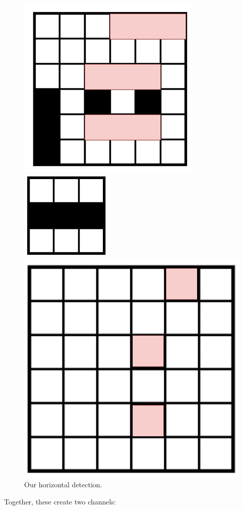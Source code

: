         \begin{figure}[ht]
            \begin{minipage}{.35\textwidth}
              \centering
              \includegraphics[width=.35\linewidth]{images/convolutional_neural_networks_images/horizontal_detection.png}
            \end{minipage}
            \begin{minipage}{.25\textwidth}
                \centering
                \includegraphics[width=.25\linewidth]{images/convolutional_neural_networks_images/horizontal_filter.png}
                \caption*{$\mathlarger{\mathlarger{\mathlarger{\mathlarger{\mathlarger{\implies}}}}}$}
            \end{minipage}
            \begin{minipage}{.35\textwidth}
                \centering
                \includegraphics[width=.35\linewidth]{images/convolutional_neural_networks_images/horizontal_channel.png}
            \end{minipage}
            \caption*{Our horizontal detection.}
        \end{figure}

        Together, these create two channels:
  

